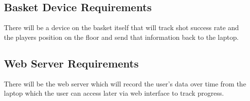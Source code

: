 \subsection{Basket Device Requirements}
\hspace*{4mm} There will be a device on the basket itself that will track shot success rate and the players position on the floor and send that information back to the laptop.

\subsection{Web Server Requirements}
\hspace*{4mm}There will be the web server which will record the user's data over time from the laptop which the user can access later via web interface to track progress. 

